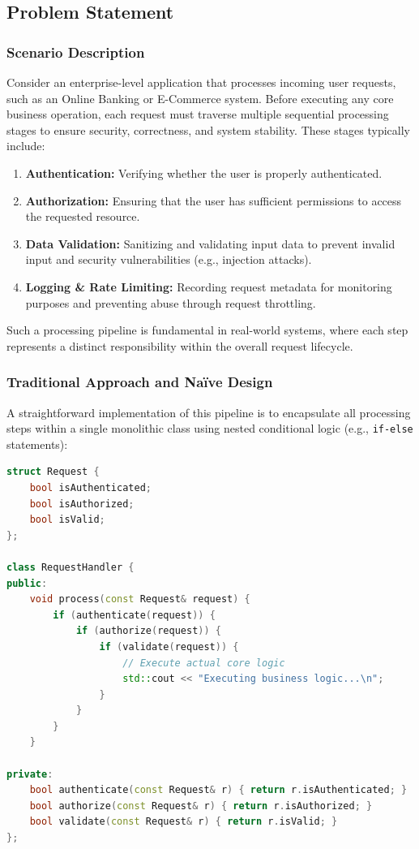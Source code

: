 \subsection{Problem Statement}

\subsubsection{Scenario Description}
Consider an enterprise-level application that processes incoming user requests, such as an Online Banking or E-Commerce system. Before executing any core business operation, each request must traverse multiple sequential processing stages to ensure security, correctness, and system stability. These stages typically include:

\begin{enumerate}
    \item \textbf{Authentication:} Verifying whether the user is properly authenticated.
    \item \textbf{Authorization:} Ensuring that the user has sufficient permissions to access the requested resource.
    \item \textbf{Data Validation:} Sanitizing and validating input data to prevent invalid input and security vulnerabilities (e.g., injection attacks).
    \item \textbf{Logging \& Rate Limiting:} Recording request metadata for monitoring purposes and preventing abuse through request throttling.
\end{enumerate}

Such a processing pipeline is fundamental in real-world systems, where each step represents a distinct responsibility within the overall request lifecycle.

\subsubsection{Traditional Approach and Naïve Design}
A straightforward implementation of this pipeline is to encapsulate all processing steps within a single monolithic class using nested conditional logic (e.g., \texttt{if-else} statements):

\begin{lstlisting}[language=C++, caption={Naïve request processing using nested conditionals}]
struct Request {
    bool isAuthenticated;
    bool isAuthorized;
    bool isValid;
};

class RequestHandler {
public:
    void process(const Request& request) {
        if (authenticate(request)) {
            if (authorize(request)) {
                if (validate(request)) {
                    // Execute actual core logic
                    std::cout << "Executing business logic...\n";
                }
            }
        }
    }

private:
    bool authenticate(const Request& r) { return r.isAuthenticated; }
    bool authorize(const Request& r) { return r.isAuthorized; }
    bool validate(const Request& r) { return r.isValid; }
};
\end{lstlisting}

